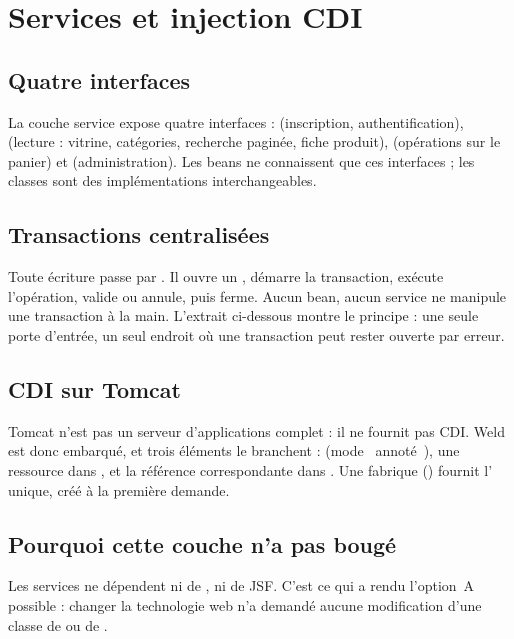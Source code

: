 \chapter{Services et injection CDI}\label{chap:services}

\section{Quatre interfaces}
La couche service expose quatre interfaces :  (inscription, authentification),
 (lecture : vitrine, catégories, recherche paginée, fiche produit), 
(opérations sur le panier) et  (administration). Les beans ne connaissent que ces
interfaces ; les classes  sont des implémentations interchangeables.

\section{Transactions centralisées}
Toute écriture passe par . Il ouvre un , démarre la transaction, exécute
l'opération, valide ou annule, puis ferme. Aucun bean, aucun service ne manipule une transaction à la main. L'extrait
ci-dessous montre le principe : une seule porte d'entrée, un seul endroit où une transaction peut rester ouverte par
erreur.



\section{CDI sur Tomcat}
Tomcat n'est pas un serveur d'applications complet : il ne fournit pas CDI. Weld est donc embarqué, et trois
éléments le branchent :  (mode \guillemotleft~annoté~\guillemotright{}), une ressource  dans
, et la référence correspondante dans . Une fabrique
() fournit l' unique, créé à la première demande.



\section{Pourquoi cette couche n'a pas bougé}
Les services ne dépendent ni de , ni de JSF. C'est ce qui a rendu l'option~A possible :
changer la technologie web n'a demandé aucune modification d'une classe de  ou de
.
